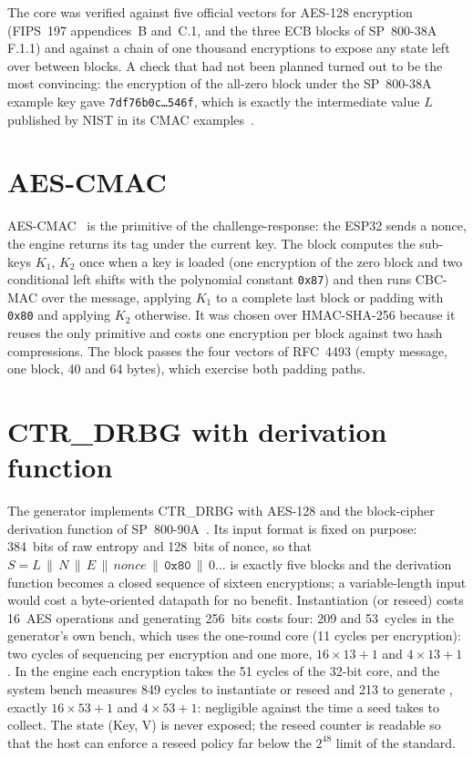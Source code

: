 The core was verified against five official vectors for
AES-128 encryption (FIPS~197 appendices~B and~C.1, and the three ECB
blocks of SP~800-38A F.1.1) and against a chain of one thousand
encryptions to expose any state left over between blocks. A check that
had not been planned turned out to be the most convincing: the
encryption of the all-zero block under the SP~800-38A example key gave
\texttt{7df76b0c\ldots546f}, which is exactly the intermediate value $L$
published by NIST in its CMAC examples~\cite{nist_cmac_examples}.

\section{AES-CMAC}
\label{sec:cmac}

AES-CMAC~\cite{nist_2016_sp80038b, song_2006_rfc4493} is the primitive of
the challenge-response: the ESP32 sends a nonce, the engine returns its
tag under the current key. The block computes the sub-keys $K_1$, $K_2$
once when a key is loaded (one encryption of the zero block and two
conditional left shifts with the polynomial constant \texttt{0x87}) and
then runs CBC-MAC over the message, applying $K_1$ to a complete last
block or padding with \texttt{0x80} and applying $K_2$ otherwise. It was
chosen over HMAC-SHA-256 because it reuses the only primitive and costs
one encryption per block against two hash compressions. The block passes
the four vectors of RFC~4493 (empty message, one block, 40 and 64 bytes),
which exercise both padding paths.

\section{CTR\_DRBG with derivation function}
\label{sec:drbg}

The generator implements CTR\_DRBG with AES-128 and the block-cipher
derivation function of SP~800-90A~\cite{barker_2015_sp80090ar1}. Its
input format is fixed on purpose: 384~bits of raw entropy and 128~bits of
nonce, so that $S = L\,\|\,N\,\|\,E\,\|\,\mathit{nonce}\,\|\,\texttt{0x80}\,\|\,0\ldots$
is exactly five blocks and the derivation function becomes a closed
sequence of sixteen encryptions; a variable-length input would cost a
byte-oriented datapath for no benefit. Instantiation (or reseed) costs
16~AES operations and generating 256~bits costs four: 209 and 53~cycles
in the generator's own bench, which uses the one-round core (11 cycles
per encryption): two cycles of sequencing per encryption and one more,
$16 \times 13 + 1$ and $4 \times 13 + 1$ \simu{}. In the engine each
encryption takes the 51 cycles of the 32-bit core, and the system bench
measures 849 cycles to instantiate or reseed and 213 to generate
\simu{}, exactly $16 \times 53 + 1$ and $4 \times 53 + 1$: negligible
against the time a seed takes to collect.
The state (Key, V) is never exposed; the reseed counter is readable so
that the host can enforce a reseed policy far below the $2^{48}$ limit of
the standard.


